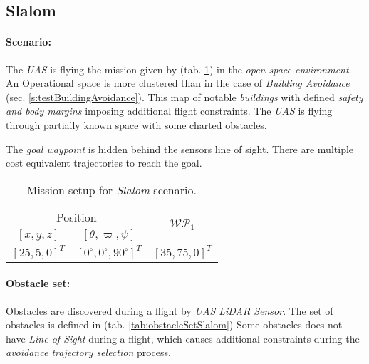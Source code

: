 \subsection{Slalom}\label{s:testSlalom}

\paragraph{Scenario:} The \emph{UAS} is flying the mission given by (tab. \ref{tab:missionSetupSlalomScenario}) in the \emph{open-space environment}. An Operational space is more clustered than in the case of \emph{Building Avoidance} (sec. \ref{s:testBuildingAvoidance}). This map of notable \emph{buildings} with defined \emph{safety and body margins} imposing additional flight constraints. The \emph{UAS} is flying through partially known space with some charted obstacles. 

The \emph{goal waypoint} is hidden behind the sensors line of sight. There are multiple cost equivalent trajectories to reach the goal. 

\begin{table}[H]
    \centering
    \begin{tabular}{c|c||c}
        \multicolumn{2}{c||}{Position} & \multirow{2}{*}{$\mathscr{WP}_1$} \\\cline{1-2}
        $[x,y,z]$           & $[\theta,\varpi,\psi]$           & \\\hline\hline
        $[25,5,0]^T $        & $[0^\circ,0^\circ,90^\circ]^T$    & $[35,75,0]^T$        \\ 
    \end{tabular}
    \caption{Mission setup for \emph{Slalom} scenario.}
    \label{tab:missionSetupSlalomScenario}
\end{table}

\paragraph{Obstacle set:} Obstacles are discovered during a flight by \emph{UAS LiDAR Sensor}. The set of obstacles is defined in (tab. \ref{tab:obstacleSetSlalom}) Some obstacles does not have \emph{Line of Sight} during a flight, which causes additional constraints during the \emph{avoidance trajectory selection} process.

